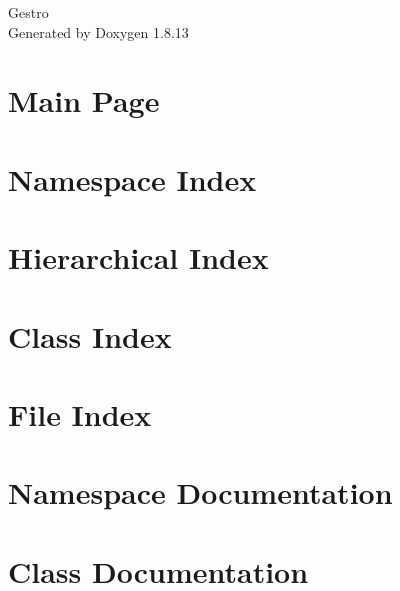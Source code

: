 \documentclass[twoside]{book}
\newcommand{\+}{\discretionary{\mbox{\scriptsize$\hookleftarrow$}}{}{}}
\newcommand{\clearemptydoublepage}{%
  \newpage{\pagestyle{empty}\cleardoublepage}%
}
\begin{document}
\hypersetup{pageanchor=false,
             bookmarksnumbered=true,
             pdfencoding=unicode
            }
\begin{titlepage}
\vspace*{7cm}
\begin{center}%
{\Large Gestro }\\
\vspace*{1cm}
{\large Generated by Doxygen 1.8.13}\\
\end{center}
\end{titlepage}
\clearemptydoublepage
{}
\tableofcontents
\clearemptydoublepage
{}
\hypersetup{pageanchor=true}

\chapter{Main Page}
\label{index}\hypertarget{index}{}
\chapter{Namespace Index}

\chapter{Hierarchical Index}

\chapter{Class Index}

\chapter{File Index}

\chapter{Namespace Documentation}




\chapter{Class Documentation}




















\end{document}
